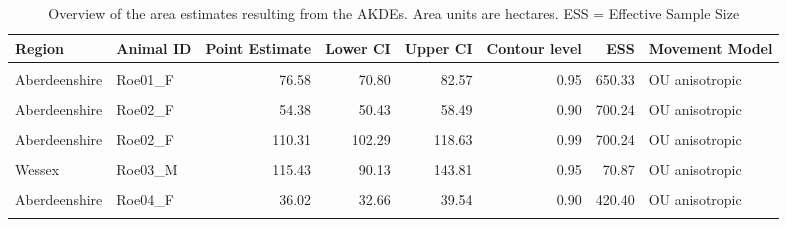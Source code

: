 \documentclass[10pt,a4paper]{article}
\begin{document}
\begingroup\fontsize{9}{11}\selectfont

\begin{longtable}[t]{llrrrrrl}
\caption{\label{tab:akdeModelTable}Overview of the area estimates resulting from the AKDEs. Area units are hectares. ESS = Effective Sample Size}\\
\toprule
Region & Animal ID & Point Estimate & Lower CI & Upper CI & Contour level & ESS & Movement Model\\
\midrule
\cellcolor{gray!10}{Aberdeenshire} & \cellcolor{gray!10}{Roe01\_F} & \cellcolor{gray!10}{58.56} & \cellcolor{gray!10}{54.15} & \cellcolor{gray!10}{63.15} & \cellcolor{gray!10}{0.90} & \cellcolor{gray!10}{650.33} & \cellcolor{gray!10}{OU anisotropic}\\
Aberdeenshire & Roe01\_F & 76.58 & 70.80 & 82.57 & 0.95 & 650.33 & OU anisotropic\\
\cellcolor{gray!10}{Aberdeenshire} & \cellcolor{gray!10}{Roe01\_F} & \cellcolor{gray!10}{113.75} & \cellcolor{gray!10}{105.17} & \cellcolor{gray!10}{122.65} & \cellcolor{gray!10}{0.99} & \cellcolor{gray!10}{650.33} & \cellcolor{gray!10}{OU anisotropic}\\
Aberdeenshire & Roe02\_F & 54.38 & 50.43 & 58.49 & 0.90 & 700.24 & OU anisotropic\\
\cellcolor{gray!10}{Aberdeenshire} & \cellcolor{gray!10}{Roe02\_F} & \cellcolor{gray!10}{73.04} & \cellcolor{gray!10}{67.73} & \cellcolor{gray!10}{78.54} & \cellcolor{gray!10}{0.95} & \cellcolor{gray!10}{700.24} & \cellcolor{gray!10}{OU anisotropic}\\
\addlinespace
Aberdeenshire & Roe02\_F & 110.31 & 102.29 & 118.63 & 0.99 & 700.24 & OU anisotropic\\
\cellcolor{gray!10}{Wessex} & \cellcolor{gray!10}{Roe03\_M} & \cellcolor{gray!10}{91.66} & \cellcolor{gray!10}{71.57} & \cellcolor{gray!10}{114.20} & \cellcolor{gray!10}{0.90} & \cellcolor{gray!10}{70.87} & \cellcolor{gray!10}{OU anisotropic}\\
Wessex & Roe03\_M & 115.43 & 90.13 & 143.81 & 0.95 & 70.87 & OU anisotropic\\
\cellcolor{gray!10}{Wessex} & \cellcolor{gray!10}{Roe03\_M} & \cellcolor{gray!10}{162.18} & \cellcolor{gray!10}{126.63} & \cellcolor{gray!10}{202.05} & \cellcolor{gray!10}{0.99} & \cellcolor{gray!10}{70.87} & \cellcolor{gray!10}{OU anisotropic}\\
Aberdeenshire & Roe04\_F & 36.02 & 32.66 & 39.54 & 0.90 & 420.40 & OU anisotropic\\
\addlinespace
\cellcolor{gray!10}{Aberdeenshire} & \cellcolor{gray!10}{Roe04\_F} & \cellcolor{gray!10}{46.12} & \cellcolor{gray!10}{41.82} & \cellcolor{gray!10}{50.63} & \cellcolor{gray!10}{0.95} & \cellcolor{gray!10}{420.40} & \cellcolor{gray!10}{OU anisotropic}\\

\end{longtable}
\end{document}
